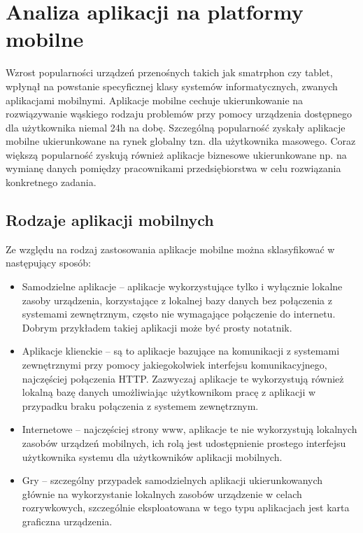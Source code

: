 \chapter{Analiza aplikacji na platformy mobilne}
\label{cha:analizaAplikacjiMobilnych}

Wzrost popularności urządzeń przenośnych takich jak smatrphon czy tablet, wpłynął na powstanie specyficznej klasy systemów informatycznych, zwanych aplikacjami mobilnymi. Aplikacje mobilne cechuje ukierunkowanie na rozwiązywanie wąskiego rodzaju problemów przy pomocy urządzenia dostępnego dla użytkownika niemal 24h na dobę. Szczególną popularność zyskały aplikacje mobilne ukierunkowane na rynek globalny tzn. dla użytkownika masowego. Coraz większą popularność zyskują również aplikacje biznesowe ukierunkowane np. na wymianę danych pomiędzy pracownikami przedsiębiorstwa w celu rozwiązania konkretnego zadania. 

\section{Rodzaje aplikacji mobilnych}
\label{sec:rodzajeAplikacjiMobilnych}

Ze względu na rodzaj zastosowania aplikacje mobilne można sklasyfikować w następujący sposób:

\begin{itemize}
\item Samodzielne aplikacje -- aplikacje wykorzystujące tylko i wyłącznie lokalne zasoby urządzenia, korzystające z lokalnej bazy danych bez połączenia z systemami zewnętrznym, często nie wymagające połączenie do internetu. Dobrym przykładem takiej aplikacji może być prosty notatnik.  
\item Aplikacje klienckie -- są to aplikacje bazujące na komunikacji z systemami zewnętrznymi przy pomocy jakiegokolwiek interfejsu komunikacyjnego,  najczęściej połączenia HTTP. Zazwyczaj aplikacje te wykorzystują również lokalną bazę danych umożliwiając użytkownikom pracę z aplikacji w przypadku braku połączenia z systemem zewnętrznym.
\item Internetowe -- najczęściej strony www, aplikacje  te nie wykorzystują lokalnych zasobów urządzeń mobilnych, ich rolą jest udostępnienie prostego interfejsu użytkownika systemu dla użytkowników aplikacji mobilnych.
\item Gry  -- szczególny przypadek samodzielnych aplikacji ukierunkowanych głównie na wykorzystanie lokalnych zasobów urządzenie w celach rozrywkowych, szczególnie eksploatowana w tego typu aplikacjach jest karta graficzna urządzenia.
\end{itemize}

